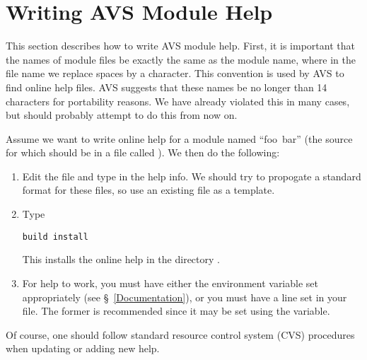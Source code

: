 
\section{Writing AVS Module Help}
\label{Writing AVS Module Help}

This section describes how to write AVS module help.
First, it is important that the names of module files be exactly the
same as the module name, where in the file name we replace spaces by
a \code{_} character.
This convention is used by AVS to find online help files.
AVS suggests that these names be no longer than 14 characters
for portability reasons.
We have already violated this in many cases, but should probably
attempt to do this from now on.

Assume we want to write online help for a module named ``foo~bar''
(the source for which should be in a file called ).
We then do the following:
\begin{enumerate}

\item
Edit the file  and type in the help info.
We should try to propogate a standard format for these files,
so use an existing file as a template.

\item
Type
\begin{display}\begin{verbatim}
build install
\end{verbatim}\end{display}
This installs the online help in the directory
.

\item
For help to work, you must have either the environment variable
 set appropriately (see \S~\ref{Documentation}),
or you must have a  line set in your  file.
The former is recommended since it may be set using the
 variable.

\end{enumerate}
Of course, one should follow standard resource control system (CVS)
procedures when updating or adding new help.



